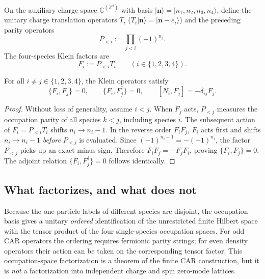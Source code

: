 \begin{definition}
\label{def:ch21-four-klein}
On the auxiliary charge space $\mathbb C^{(\mathbb Z^4)}$ with basis $|\mathbf n\rangle = |n_1, n_2, n_3, n_4\rangle$,
define the unitary charge translation operators $T_i$ ($T_i |\mathbf n\rangle = |\mathbf n - e_i\rangle$)
and the preceding parity operators
\begin{equation}
 P_{<i} := \prod_{j < i} (-1)^{n_j}.
 \label{eq:ch21-preceding-parity}
\end{equation}
The four-species Klein factors are
\begin{equation}
 F_i := P_{<i} T_i \qquad (i \in \{1, 2, 3, 4\}).
 \label{eq:ch21-four-klein-def}
\end{equation}
\end{definition}

\begin{proposition}
\label{prop:ch21-klein-anticommute}
For all $i \ne j \in \{1, 2, 3, 4\}$, the Klein operators satisfy
\begin{equation}
 \{F_i, F_j\} = 0, \qquad \{F_i, F_j^\dagger\} = 0, \qquad [N_i, F_j] = -\delta_{ij} F_j.
 \label{eq:ch21-klein-anticomm-relations}
\end{equation}
\end{proposition}
\begin{proof}
Without loss of generality, assume $i < j$.
When $F_j$ acts, $P_{<j}$ measures the occupation parity of all species $k < j$, including species $i$.
The subsequent action of $F_i = P_{<i} T_i$ shifts $n_i \to n_i - 1$.
In the reverse order $F_i F_j$, $F_i$ acts first and shifts $n_i \to n_i - 1$ \emph{before} $P_{<j}$ is evaluated.
Since $(-1)^{n_i - 1} = -(-1)^{n_i}$, the factor $P_{<j}$ picks up an exact minus sign.
Therefore $F_i F_j = - F_j F_i$, proving $\{F_i, F_j\} = 0$.
The adjoint relation $\{F_i, F_j^\dagger\} = 0$ follows identically.
\end{proof}

\subsection*{What factorizes, and what does not}

Because the one-particle labels of different species are disjoint, the
occupation basis gives a unitary \emph{ordered} identification of the
unrestricted finite Hilbert space with the tensor product of the four
single-species occupation spaces.  For odd CAR operators the ordering
requires fermionic parity strings; for even density operators their
action can be taken on the corresponding tensor factor.  This
occupation-space factorization is a theorem of the finite CAR
construction, but it is \emph{not} a factorization into independent
charge and spin zero-mode lattices.


